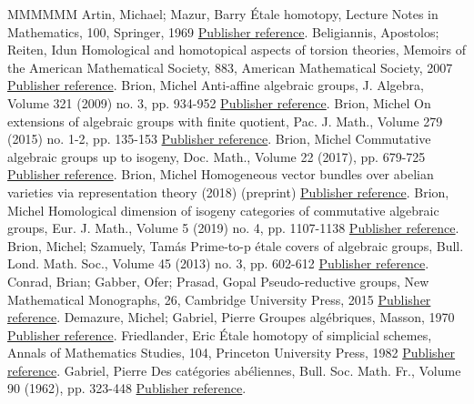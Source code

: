 \documentclass[11pt]{article}
\theoremstyle{definition}
\numberwithin{equation}{section}
\theoremstyle{remark}
\begin{document}
\begin{thebibliography}{MMMMMM}
 Artin, Michael; Mazur, Barry Étale homotopy, Lecture Notes in Mathematics, 100, Springer, 1969 \href{https://ahl.centre-mersenne.org/item/AHL_2020__3__1_0/#AM}{Publisher reference}.
 Beligiannis, Apostolos; Reiten, Idun Homological and homotopical aspects of torsion theories, Memoirs of the American Mathematical Society, 883, American Mathematical Society, 2007 \href{https://ahl.centre-mersenne.org/item/AHL_2020__3__1_0/#BR}{Publisher reference}.
 Brion, Michel Anti-affine algebraic groups, J. Algebra, Volume 321 (2009) no. 3, pp. 934-952 \href{https://ahl.centre-mersenne.org/item/AHL_2020__3__1_0/#Br09}{Publisher reference}.
 Brion, Michel On extensions of algebraic groups with finite quotient, Pac. J. Math., Volume 279 (2015) no. 1-2, pp. 135-153 \href{https://ahl.centre-mersenne.org/item/AHL_2020__3__1_0/#Br15}{Publisher reference}.
 Brion, Michel Commutative algebraic groups up to isogeny, Doc. Math., Volume 22 (2017), pp. 679-725 \href{https://ahl.centre-mersenne.org/item/AHL_2020__3__1_0/#Br17a}{Publisher reference}.
 Brion, Michel Homogeneous vector bundles over abelian varieties via representation theory (2018) (preprint) \href{https://ahl.centre-mersenne.org/item/AHL_2020__3__1_0/#Br18}{Publisher reference}.
 Brion, Michel Homological dimension of isogeny categories of commutative algebraic groups, Eur. J. Math., Volume 5 (2019) no. 4, pp. 1107-1138 \href{https://ahl.centre-mersenne.org/item/AHL_2020__3__1_0/#Br17b}{Publisher reference}.
 Brion, Michel; Szamuely, Tamás Prime-to-p étale covers of algebraic groups, Bull. Lond. Math. Soc., Volume 45 (2013) no. 3, pp. 602-612 \href{https://ahl.centre-mersenne.org/item/AHL_2020__3__1_0/#BS}{Publisher reference}.
 Conrad, Brian; Gabber, Ofer; Prasad, Gopal Pseudo-reductive groups, New Mathematical Monographs, 26, Cambridge University Press, 2015 \href{https://ahl.centre-mersenne.org/item/AHL_2020__3__1_0/#CGP}{Publisher reference}.
 Demazure, Michel; Gabriel, Pierre Groupes algébriques, Masson, 1970 \href{https://ahl.centre-mersenne.org/item/AHL_2020__3__1_0/#DG}{Publisher reference}.
 Friedlander, Eric Étale homotopy of simplicial schemes, Annals of Mathematics Studies, 104, Princeton University Press, 1982 \href{https://ahl.centre-mersenne.org/item/AHL_2020__3__1_0/#Friedlander}{Publisher reference}.
 Gabriel, Pierre Des catégories abéliennes, Bull. Soc. Math. Fr., Volume 90 (1962), pp. 323-448 \href{https://ahl.centre-mersenne.org/item/AHL_2020__3__1_0/#Gabriel}{Publisher reference}.

\end{thebibliography}
\end{document}
